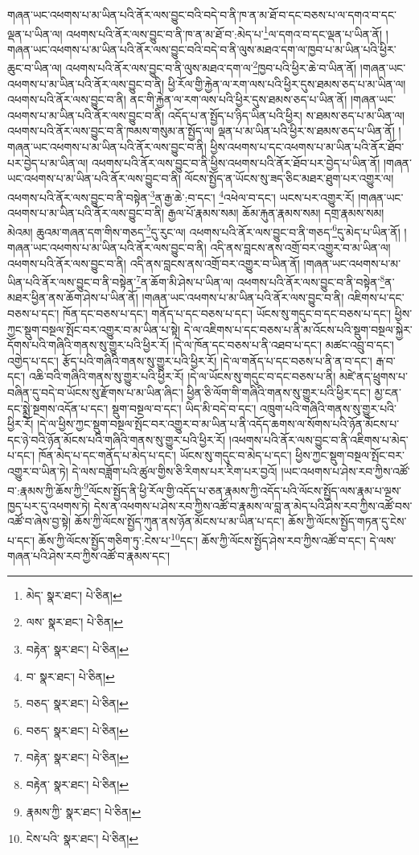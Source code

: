 གཞན་ཡང་འཕགས་པ་མ་ཡིན་པའི་ནོར་ལས་བྱུང་བའི་བདེ་བ་ནི་ཁ་ན་མ་ཐོ་བ་དང་བཅས་པ་ལ་དགའ་བ་དང་ལྡན་པ་ཡིན་ལ། འཕགས་པའི་ནོར་ལས་བྱུང་བ་ནི་ཁ་ན་མ་ཐོ་བ་:མེད་པ་\footnote{མེད་  སྣར་ཐང་།  པེ་ཅིན། }ལ་དགའ་བ་དང་ལྡན་པ་ཡིན་ནོ། །གཞན་ཡང་འཕགས་པ་མ་ཡིན་པའི་ནོར་ལས་བྱུང་བའི་བདེ་བ་ནི་ལུས་མཐའ་དག་ལ་ཁྱབ་པ་མ་ཡིན་པའི་ཕྱིར་ཆུང་བ་ཡིན་ལ། འཕགས་པའི་ནོར་ལས་བྱུང་བ་ནི་ལུས་མཐའ་དག་ལ་\footnote{ལས་  སྣར་ཐང་།  པེ་ཅིན། }ཁྱབ་པའི་ཕྱིར་ཆེ་བ་ཡིན་ནོ། །གཞན་ཡང་འཕགས་པ་མ་ཡིན་པའི་ནོར་ལས་བྱུང་བ་ནི། ཕྱི་རོལ་གྱི་རྐྱེན་ལ་རག་ལས་པའི་ཕྱིར་དུས་ཐམས་ཅད་པ་མ་ཡིན་ལ། འཕགས་པའི་ནོར་ལས་བྱུང་བ་ནི། ནང་གི་རྐྱེན་ལ་རག་ལས་པའི་ཕྱིར་དུས་ཐམས་ཅད་པ་ཡིན་ནོ། །གཞན་ཡང་འཕགས་པ་མ་ཡིན་པའི་ནོར་ལས་བྱུང་བ་ནི། འདོད་པ་ན་སྤྱོད་པ་ཉིད་ཡིན་པའི་ཕྱིར། ས་ཐམས་ཅད་པ་མ་ཡིན་ལ། འཕགས་པའི་ནོར་ལས་བྱུང་བ་ནི་ཁམས་གསུམ་ན་སྤྱོད་ལ། ལྡན་པ་མ་ཡིན་པའི་ཕྱིར་ས་ཐམས་ཅད་པ་ཡིན་ནོ། །གཞན་ཡང་འཕགས་པ་མ་ཡིན་པའི་ནོར་ལས་བྱུང་བ་ནི། ཕྱིས་འཕགས་པ་དང་འཕགས་པ་མ་ཡིན་པའི་ནོར་ཐོབ་པར་བྱེད་པ་མ་ཡིན་ལ། འཕགས་པའི་ནོར་ལས་བྱུང་བ་ནི་ཕྱིས་འཕགས་པའི་ནོར་ཐོབ་པར་བྱེད་པ་ཡིན་ནོ། །གཞན་ཡང་འཕགས་པ་མ་ཡིན་པའི་ནོར་ལས་བྱུང་བ་ནི། ལོངས་སྤྱོད་ན་ཡོངས་སུ་ཟད་ཅིང་མཐར་ཐུག་པར་འགྱུར་ལ། འཕགས་པའི་ནོར་ལས་བྱུང་བ་ནི་བསྟེན་\footnote{བརྟེན་  སྣར་ཐང་།  པེ་ཅིན། }ན་རྒྱ་ཆེ་:བ་དང་། \footnote{བ་  སྣར་ཐང་།  པེ་ཅིན། }འཕེལ་བ་དང་། ཡངས་པར་འགྱུར་རོ། །གཞན་ཡང་འཕགས་པ་མ་ཡིན་པའི་ནོར་ལས་བྱུང་བ་ནི། རྒྱལ་པོ་རྣམས་སམ། ཆོམ་རྐུན་རྣམས་སམ། དགྲ་རྣམས་སམ། མེའམ། ཆུའམ་གཞན་དག་གིས་གཅད་\footnote{བཅད་  སྣར་ཐང་།  པེ་ཅིན། }དུ་རུང་ལ། འཕགས་པའི་ནོར་ལས་བྱུང་བ་ནི་གཅད་\footnote{བཅད་  སྣར་ཐང་།  པེ་ཅིན། }དུ་མེད་པ་ཡིན་ནོ། །གཞན་ཡང་འཕགས་པ་མ་ཡིན་པའི་ནོར་ལས་བྱུང་བ་ནི། འདི་ནས་བླངས་ནས་འགྲོ་བར་འགྱུར་བ་མ་ཡིན་ལ། འཕགས་པའི་ནོར་ལས་བྱུང་བ་ནི། འདི་ནས་བླངས་ནས་འགྲོ་བར་འགྱུར་བ་ཡིན་ནོ། །གཞན་ཡང་འཕགས་པ་མ་ཡིན་པའི་ནོར་ལས་བྱུང་བ་ནི་བསྟེན་\footnote{བརྟེན་  སྣར་ཐང་།  པེ་ཅིན། }ན་ཆོག་མི་ཤེས་པ་ཡིན་ལ། འཕགས་པའི་ནོར་ལས་བྱུང་བ་ནི་བསྟེན་\footnote{བརྟེན་  སྣར་ཐང་།  པེ་ཅིན། }ན་མཐར་ཕྱིན་ནས་ཆོག་ཤེས་པ་ཡིན་ནོ། །གཞན་ཡང་འཕགས་པ་མ་ཡིན་པའི་ནོར་ལས་བྱུང་བ་ནི། འཇིགས་པ་དང་བཅས་པ་དང་། ཁོན་དང་བཅས་པ་དང་། གནོད་པ་དང་བཅས་པ་དང་། ཡོངས་སུ་གདུང་བ་དང་བཅས་པ་དང་། ཕྱིས་ཀྱང་སྡུག་བསྔལ་སྤོང་བར་འགྱུར་བ་མ་ཡིན་པ་སྟེ། དེ་ལ་འཇིགས་པ་དང་བཅས་པ་ནི་མ་འོངས་པའི་སྡུག་བསྔལ་སྐྱེར་དོགས་པའི་གཞིའི་གནས་སུ་གྱུར་པའི་ཕྱིར་རོ། །དེ་ལ་ཁོན་དང་བཅས་པ་ནི་འཐབ་པ་དང་། མཚང་འབྲུ་བ་དང་། འགྱེད་པ་དང་། རྩོད་པའི་གཞིའི་གནས་སུ་གྱུར་པའི་ཕྱིར་རོ། །དེ་ལ་གནོད་པ་དང་བཅས་པ་ནི་ན་བ་དང་། རྒ་བ་དང་། འཆི་བའི་གཞིའི་གནས་སུ་གྱུར་པའི་ཕྱིར་རོ། །དེ་ལ་ཡོངས་སུ་གདུང་བ་དང་བཅས་པ་ནི། མཛེ་ནད་ཕྲུགས་པ་བཞིན་དུ་བདེ་བ་ཡོངས་སུ་རྫོགས་པ་མ་ཡིན་ཞིང་། ཕྱིན་ཅི་ལོག་གི་གཞིའི་གནས་སུ་གྱུར་པའི་ཕྱིར་དང་། མྱ་ངན་དང་སྨྲེ་སྔགས་འདོན་པ་དང་། སྡུག་བསྔལ་བ་དང་། ཡིད་མི་བདེ་བ་དང་། འཁྲུག་པའི་གཞིའི་གནས་སུ་གྱུར་པའི་ཕྱིར་རོ། །དེ་ལ་ཕྱིས་ཀྱང་སྡུག་བསྔལ་སྤོང་བར་འགྱུར་བ་མ་ཡིན་པ་ནི་འདོད་ཆགས་ལ་སོགས་པའི་ཉོན་མོངས་པ་དང་ཉེ་བའི་ཉོན་མོངས་པའི་གཞིའི་གནས་སུ་གྱུར་པའི་ཕྱིར་རོ། །འཕགས་པའི་ནོར་ལས་བྱུང་བ་ནི་འཇིགས་པ་མེད་པ་དང་། ཁོན་མེད་པ་དང་གནོད་པ་མེད་པ་དང་། ཡོངས་སུ་གདུང་བ་མེད་པ་དང་། ཕྱིས་ཀྱང་སྡུག་བསྔལ་སྤོང་བར་འགྱུར་བ་ཡིན་ཏེ། དེ་ལས་བཟློག་པའི་ཚུལ་གྱིས་ཅི་རིགས་པར་རིག་པར་བྱའོ། །ཡང་འཕགས་པ་ཤེས་རབ་ཀྱིས་འཚོ་བ་:རྣམས་ཀྱི་ཆོས་ཀྱི་\footnote{རྣམས་ཀྱི་  སྣར་ཐང་།  པེ་ཅིན། }ལོངས་སྤྱོད་ནི་ཕྱི་རོལ་གྱི་འདོད་པ་ཅན་རྣམས་ཀྱི་འདོད་པའི་ལོངས་སྤྱོད་ལས་རྣམ་པ་ལྔས་ཁྱད་པར་དུ་འཕགས་ཏེ། དེས་ན་འཕགས་པ་ཤེས་རབ་ཀྱིས་འཚོ་བ་རྣམས་ལ་བླ་ན་མེད་པའི་ཤེས་རབ་ཀྱིས་འཚོ་བས་འཚོ་བ་ཞེས་བྱ་སྟེ། ཆོས་ཀྱི་ལོངས་སྤྱོད་ཀུན་ནས་ཉོན་མོངས་པ་མ་ཡིན་པ་དང་། ཆོས་ཀྱི་ལོངས་སྤྱོད་གཏན་དུ་ངེས་པ་དང་། ཆོས་ཀྱི་ལོངས་སྤྱོད་གཅིག་ཏུ་:ངེས་པ་\footnote{ངེས་པའི་  སྣར་ཐང་།  པེ་ཅིན། }དང་། ཆོས་ཀྱི་ལོངས་སྤྱོད་ཤེས་རབ་ཀྱིས་འཚོ་བ་དང་། དེ་ལས་གཞན་པའི་ཤེས་རབ་ཀྱིས་འཚོ་བ་རྣམས་དང་། 